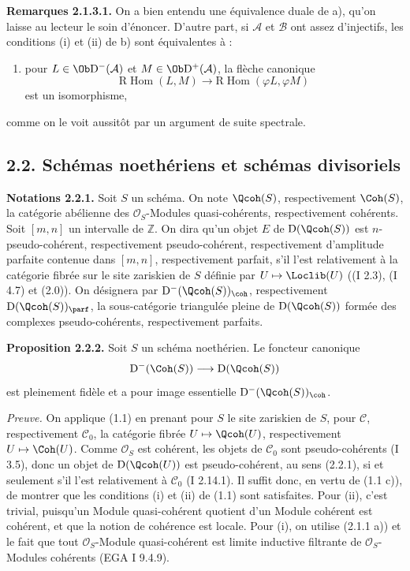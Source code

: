 \documentclass[11pt]{article}
\begin{document}
\textbf{Remarques 2.1.3.1.} On a bien entendu une équivalence duale de a), qu'on laisse au lecteur le soin d'énoncer. D'autre part, si $\mathcal A$ et $\mathcal B$ ont assez d'injectifs, les conditions (i) et (ii) de b) sont équivalentes à :
\begin{enumerate}[label=(\roman*),start=3]
\item pour $L\in\Ob\mathrm D^{-}(\mathcal A)$ et $M\in\Ob\mathrm D^{+}(\mathcal A)$, la flèche canonique
\[
\mathrm R\!\operatorname{Hom}(L,M)\longrightarrow
\mathrm R\!\operatorname{Hom}(\varphi L,\varphi M)
\]
est un isomorphisme,
\end{enumerate}
comme on le voit aussitôt par un argument de suite spectrale.

\subsection*{2.2. Schémas noethériens et schémas divisoriels}

\textbf{Notations 2.2.1.} Soit $S$ un schéma. On note $\Qcoh(S)$, respectivement $\Coh(S)$, la catégorie abélienne des $\mathcal O_S$-Modules quasi-cohérents, respectivement cohérents. Soit $[m,n]$ un intervalle de $\mathbb Z$. On dira qu'un objet $E$ de $\mathrm D(\Qcoh(S))$ est $n$-pseudo-cohérent, respectivement pseudo-cohérent, respectivement d'amplitude parfaite contenue dans $[m,n]$, respectivement parfait, s'il l'est relativement à la catégorie fibrée sur le site zariskien de $S$ définie par $U\mapsto\Loclib(U)$ ((I 2.3), (I 4.7) et (2.0)). On désignera par $\mathrm D^{-}(\Qcoh(S))_{\coh}$, respectivement $\mathrm D(\Qcoh(S))_{\parf}$, la sous-catégorie triangulée pleine de $\mathrm D(\Qcoh(S))$ formée des complexes pseudo-cohérents, respectivement parfaits.

\textbf{Proposition 2.2.2.} Soit $S$ un schéma noethérien. Le foncteur canonique
\[
\mathrm D^{-}(\Coh(S))\longrightarrow \mathrm D(\Qcoh(S))
\]
est pleinement fidèle et a pour image essentielle $\mathrm D^{-}(\Qcoh(S))_{\coh}$.

\emph{Preuve.} On applique (1.1) en prenant pour $S$ le site zariskien de $S$, pour $\mathcal C$, respectivement $\mathcal C_0$, la catégorie fibrée $U\mapsto\Qcoh(U)$, respectivement $U\mapsto\Coh(U)$. Comme $\mathcal O_S$ est cohérent, les objets de $\mathcal C_0$ sont pseudo-cohérents (I 3.5), donc un objet de $\mathrm D(\Qcoh(U))$ est pseudo-cohérent, au sens (2.2.1), si et seulement s'il l'est relativement à $\mathcal C_0$ (I 2.14.1). Il suffit donc, en vertu de (1.1 c)), de montrer que les conditions (i) et (ii) de (1.1) sont satisfaites. Pour (ii), c'est trivial, puisqu'un Module quasi-cohérent quotient d'un Module cohérent est cohérent, et que la notion de cohérence est locale. Pour (i), on utilise (2.1.1 a)) et le fait que tout $\mathcal O_S$-Module quasi-cohérent est limite inductive filtrante de $\mathcal O_S$-Modules cohérents (EGA I 9.4.9).
\end{document}
